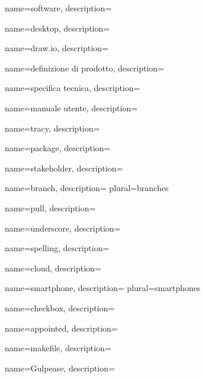  {
	name=software,
	description={\TODO{}}
}

 {
	name=desktop,
	description={\TODO{}}
}

 {
	name=draw.io,
	description={\TODO{}}
}

 {
	name=definizione di prodotto,
	description={\TODO{}}
}

 {
	name=specifica tecnica,
	description={\TODO{}}
}

 {
	name=manuale utente,
	description={\TODO{}}
}

 {
	name=tracy,
	description={\TODO{}}
}

 {
	name=package,
	description={\TODO{}}
}

 {
	name=stakeholder,
	description={\TODO{}}
}

 {
	name=branch,
	description={\TODO{}}
	plural=branches
}

 {
	name=pull,
	description={\TODO{}}
}

 {
	name=underscore,
	description={\TODO{}}
}

 {
	name=spelling,
	description={\TODO{}}
}

 {
	name=cloud,
	description={\TODO{}}
}

 {
	name=smartphone,
	description={\TODO{}}
	plural=smartphones
}

 {
	name=checkbox,
	description={\TODO{}}
}

 {
	name=appointed,
	description={\TODO{}}
}

 {
	name=makefile,
	description={\TODO{}}
}

 {
	name=Gulpease,
	description={\TODO{}}
}
